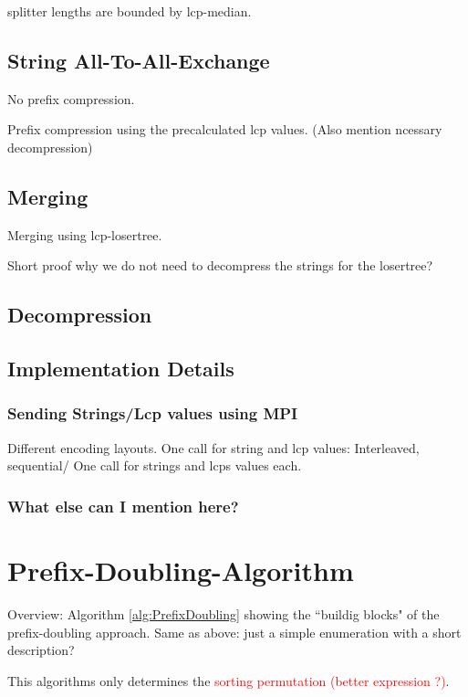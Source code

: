 \documentclass[12pt,a4paper,twoside]{scrartcl}
\numberwithin{equation}{section}
\begin{document}
splitter lengths are bounded by lcp-median.

\subsection{String All-To-All-Exchange}

No prefix compression.

Prefix compression using the precalculated lcp values. (Also mention ncessary decompression)

\subsection{Merging}

Merging using lcp-losertree. 

Short proof why we do not need to decompress the strings for the losertree?

\subsection{Decompression}

\subsection{Implementation Details}

\subsubsection{Sending Strings/Lcp values using MPI}

Different encoding layouts. One call for string and lcp values: Interleaved, sequential/ One call for strings and lcps values each.

\subsubsection{What else can I mention here?}

\section{Prefix-Doubling-Algorithm}

Overview: Algorithm \ref{alg:PrefixDoubling} showing the ``buildig blocks" of the prefix-doubling approach. Same as above: just a simple enumeration with a short description?

This algorithms only determines the \textcolor{red}{sorting permutation (better expression ?)}. 
\end{document}
